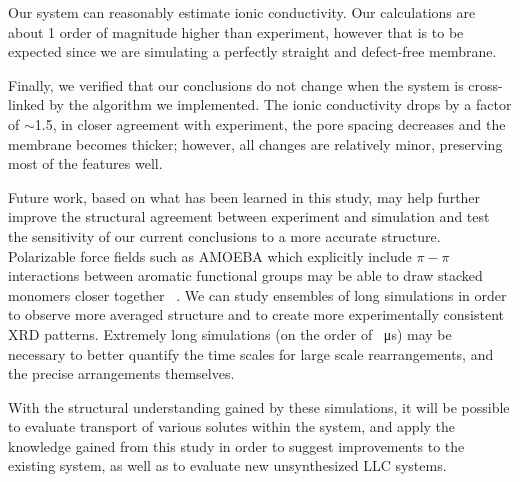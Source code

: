   Our system can reasonably estimate ionic conductivity. Our
  calculations are about 1 order of magnitude higher than experiment, however
  that is to be expected since we are simulating a perfectly straight and
  defect-free membrane. 

  Finally, we verified that our conclusions do not change when the system is
  cross-linked by the algorithm we implemented. The ionic conductivity drops by a factor
  of $\sim$1.5, in closer agreement with experiment, the pore spacing decreases and
  the membrane becomes thicker; however, all changes are relatively minor, 
  preserving most of the features well.

  \label{addition:forcefield-structure}
  Future work, based on what has been learned in this study, may help further
  improve the structural agreement between experiment and simulation and test
  the sensitivity of our current conclusions to a more accurate structure. 
  Polarizable force fields such as AMOEBA which explicitly include $\pi-\pi$ interactions
  between aromatic functional groups may be able to draw stacked monomers closer together 
  ~\cite{shi_polarizable_2013,kaminski_development_2004,lopes_polarizable_2007}. 
  We can study ensembles of long simulations in order
  to observe more averaged structure and to create more experimentally consistent
  XRD patterns. Extremely long simulations (on the order of \SI{}{\micro s}) may
  be necessary to better quantify the time scales for large scale rearrangements,
  and the precise arrangements themselves.

  With the structural understanding gained by these simulations, it will be
  possible to evaluate transport of various solutes within the system, and apply the
  knowledge gained from this study in order to suggest improvements to the
  existing system, as well as to evaluate new unsynthesized LLC systems.

